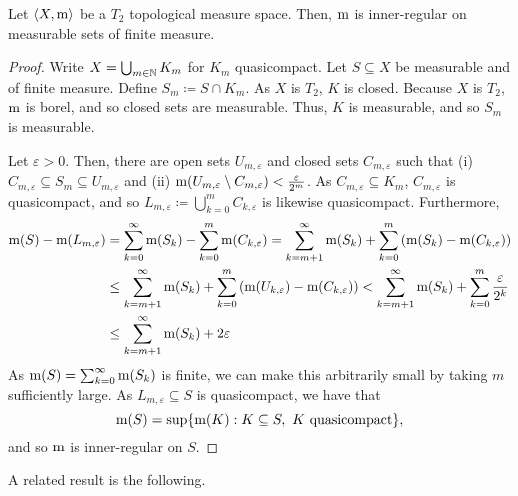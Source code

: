 \begin{prp}\label{InnerRegularFinite}
Let $\langle X,\mathrm{m}\rangle$ be a $T_2$ topological measure space.  Then, $\mathrm{m}$ is inner-regular on measurable sets of finite measure.
\begin{proof}
Write $X=\bigcup _{m\in \mathbb{N}}K_m$ for $K_m$ quasicompact.  Let $S\subseteq X$ be measurable and of finite measure.  Define $S_m\coloneqq S\cap K_m$.  As $X$ is $T_2$, $K$ is closed.  Because $X$ is $T_2$, $\mathrm{m}$ is borel, and so closed sets are measurable.  Thus, $K$ is measurable, and so $S_m$ is measurable.
    
Let $\varepsilon >0$.  Then, there are open sets $U_{m,\varepsilon}$ and closed sets $C_{m,\varepsilon}$ such that (i) $C_{m,\varepsilon}\subseteq S_m\subseteq U_{m,\varepsilon}$ and (ii) $\mathrm{m} (U_{m,\varepsilon}\setminus C_{m,\varepsilon})<\frac{\varepsilon}{2^m}$.  As $C_{m,\varepsilon}\subseteq K_m$, $C_{m,\varepsilon}$ is quasicompact, and so $L_{m,\varepsilon}\coloneqq \bigcup _{k=0}^mC_{k,\varepsilon}$ is likewise quasicompact.  Furthermore,
\begin{equation}
\begin{split}
\mathrm{m} (S)-\mathrm{m} (L_{m,\varepsilon}) & =\sum _{k=0}^\infty \mathrm{m} (S_k)-\sum _{k=0}^m\mathrm{m} (C_{k,\varepsilon})=\sum _{k=m+1}^\infty \mathrm{m} (S_k)+\sum _{k=0}^m\left( \mathrm{m} (S_k)-\mathrm{m} (C_{k,\varepsilon})\right) \\
& \leq \sum _{k=m+1}^\infty \mathrm{m} (S_k)+\sum _{k=0}^m\left( \mathrm{m} (U_{k,\varepsilon})-\mathrm{m} (C_{k,\varepsilon})\right) <\sum _{k=m+1}^\infty \mathrm{m} (S_k)+\sum _{k=0}^m\frac{\varepsilon}{2^k} \\
& \leq \sum _{k=m+1}^\infty \mathrm{m} (S_k)+2\varepsilon
\end{split}
\end{equation}
As $\mathrm{m} (S)=\sum _{k=0}^\infty \mathrm{m} (S_k)$ is finite, we can make this arbitrarily small by taking $m$ sufficiently large.  As $L_{m,\varepsilon}\subseteq S$ is quasicompact, we have that
\begin{equation}
\mathrm{m} (S)=\sup \{ \mathrm{m} (K):K\subseteq S,\ K\text{ quasicompact}\} ,
\end{equation}
and so $\mathrm{m}$ is inner-regular on $S$.
\end{proof}
\end{prp}
A related result is the following.
